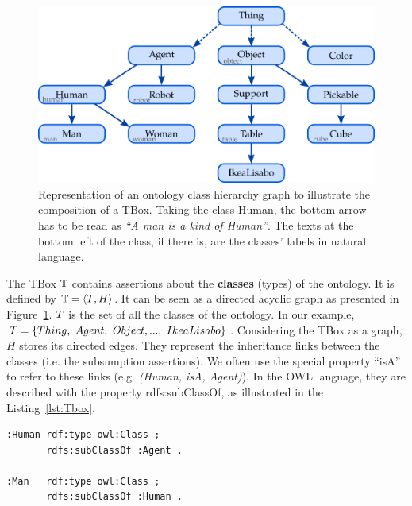 \begin{figure}[ht!]
\centering
\includegraphics[scale=0.4]{figures/chapter2/Tbox.png}
\caption{\label{fig:Tbox} Representation of an ontology class hierarchy graph to illustrate the composition of a TBox. Taking the class Human, the bottom arrow has to be read as \textit{``A man is a kind of Human''}. The texts at the bottom left of the class, if there is, are the classes' labels in natural language.}
\end{figure}

The TBox $\mathbb{T}$ contains assertions about the \textbf{classes} (types) of the ontology. It is defined by $\mathbb{T} = \langle T, H \rangle$. It can be seen as a directed acyclic graph as presented in Figure~\ref{fig:Tbox}. $T$ is the set of all the classes of the ontology. In our example, $T = \{Thing,\ Agent,\ Object, ...,\ IkeaLisabo\}$. Considering the TBox as a graph, $H$ stores its directed edges. They represent the inheritance links between the classes (i.e. the subsumption assertions). We often use the special property ``isA'' to refer to these links (e.g. \textit{(Human, isA, Agent)}). In the OWL language, they are described with the property rdfs:subClassOf, as illustrated in the Listing~\ref{lst:Tbox}.

\noindent
\begin{minipage}{\textwidth}
\begin{lstlisting}[frame=single, basicstyle=\scriptsize\ttfamily, label={lst:Tbox}, caption={Description of ontology classes in the OWL language using the Turle syntax.},captionpos=b, style=OwlTurtle]
:Human rdf:type owl:Class ;
       rdfs:subClassOf :Agent .

:Man   rdf:type owl:Class ;
       rdfs:subClassOf :Human .
\end{lstlisting}
\end{minipage}

